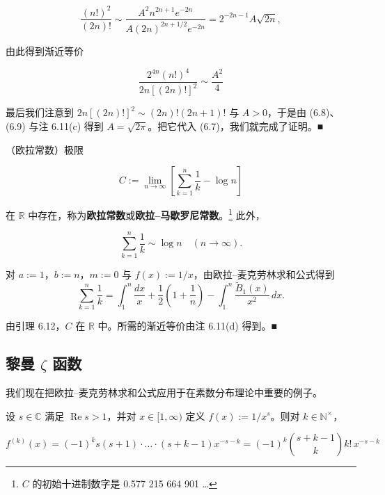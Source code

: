 \begin{example}
\begin{items}
\begin{subitems}
\[
\frac{(n!)^2}{(2n)!} \sim \frac{A^2 n^{2n+1}e^{-2n}}{A(2n)^{2n+1/2}e^{-2n}} = 2^{-2n-1}A\sqrt{2n} ,
\]

由此得到渐近等价

\begin{equation}
\frac{2^{4n}(n!)^4}{2n[(2n)!]^2} \sim \frac{A^2}{4}\tag{6.9}
\end{equation}

最后我们注意到 $ 2n[(2n)!]^2 \sim (2n)!(2n+1)! $ 与 $ A > 0 $，于是由 (6.8)、(6.9) 与注 6.11(c) 得到 $ A = \sqrt{2\pi} $。把它代入 (6.7)，我们就完成了证明。\nobreak\hspace{0.35em}■

\end{subitems}

\item

（欧拉常数）极限

\[
C := \lim_{n\to\infty}\left[ \sum_{k=1}^{n}\frac{1}{k} - \log n \right]
\]

在 $ \mathbb{R} $ 中存在，称为\textbf{欧拉常数}或\textbf{欧拉–马歇罗尼常数}。\footnote{$ C $ 的初始十进制数字是 0.577 215 664 901 \ldots} 此外，

\[
\sum_{k=1}^{n}\frac{1}{k} \sim \log n \quad (n \to \infty) .
\]

\proofhead
对 $ a := 1 $，$ b := n $，$ m := 0 $ 与 $ f(x) := 1/x $，由欧拉–麦克劳林求和公式得到
\[
\sum_{k=1}^{n}\frac{1}{k} = \int_1^n \frac{dx}{x} + \frac{1}{2}\left( 1 + \frac{1}{n} \right) - \int_1^n \frac{\widetilde{B}_1(x)}{x^2}\,dx .
\]

由引理 6.12，$ C $ 在 $ \mathbb{R} $ 中。所需的渐近等价由注 6.11(d) 得到。\nobreak\hspace{0.35em}■

\end{items}

\end{example}

\subsection*{黎曼 $ \zeta $ 函数}

我们现在把欧拉–麦克劳林求和公式应用于在素数分布理论中重要的例子。

设 $ s \in \mathbb{C} $ 满足 $ \operatorname{Re} s > 1 $，并对 $ x \in [1, \infty) $ 定义 $ f(x) := 1/x^s $。则对 $ k \in \mathbb{N}^\times $，

\[
f^{(k)}(x) = (-1)^k s(s+1)\cdot\ldots\cdot(s+k-1)x^{-s-k} = (-1)^k\binom{s+k-1}{k}k!\,x^{-s-k}
\]

